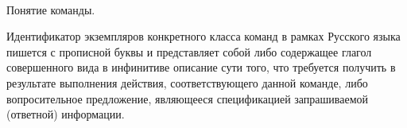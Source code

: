
\begin{frame}{\\Понятие команды.}
	\topline
	\justifying

    
    \vspace{0.33cm}
    
   Идентификатор экземпляров конкретного класса команд в рамках Русского языка пишется с прописной буквы и представляет собой либо содержащее глагол совершенного вида в инфинитиве описание сути того, что требуется получить в результате выполнения действия, соответствующего данной команде, либо вопросительное предложение, являющееся спецификацией запрашиваемой (ответной) информации.
\end{frame}

